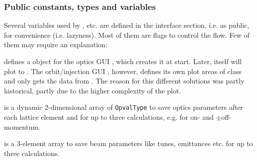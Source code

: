 \documentclass[12pt]{article}
\newcommand\code[1]{{\tt #1}}
\newcommand\guifco[1]{{\color{violet}\code{#1}}}
\newcommand{\unico}[1]{{\color{burntorange}\code{#1}}}
\newcommand{\opagui}[1]{\colorbox{blue!20}{{\color{black}\code{#1}}}}
\newcommand{\ogui}[1]{\hyperref[#1]{\opagui{#1}}}
\newcommand{\opauni}[1]{\colorbox{orange!30}{{\color{black}\code{#1}}}}
\newcommand{\ouni}[1]{\hyperref[#1]{\opauni{#1}}}
\newcommand{\pvar}[1]{\subsubsection*{Public constants, types and variables} #1}
\begin{document}
\pvar{
Several variables used by \ogui{opalinop}, \ogui{ostartmenu} etc. are defined in the interface section, i.e. as public, for convenience (i.e. lazyness). Most of them are flags to control the flow. Few of them may require an explanation:

\unico{vp} defines a \guifco{vgraph} object for the optics GUI \ogui{opalinop}, which creates it at start. Later, \ogui{linoplib} itself will plot to \unico{vp}. The orbit/injection GUI \ogui{opaorbit}, however, defines its own plot areas of class \guifco{asfigure} and only gets the data from \ouni{linoplib}. The reason for this different solutions was partly historical, partly due to the higher complexity of the \ogui{opalinop} plot.

\unico{Opval} is a dynamic 2-dimensional array of \code{OpvalType} to save optics parameters after each lattice element and for up to three calculations, e.g. for on- and $\pm$off-momentum.

\unico{Obeam} is a 3-element array to save beam parameters like tunes, emittances etc. for up to three calculations.
}
 
\end{document}
